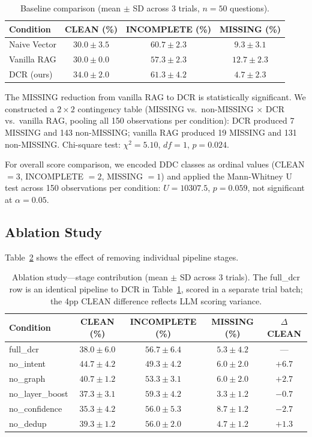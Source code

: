 \documentclass[11pt,a4paper]{article}
\begin{document}
\begin{table}[h]
\centering
\caption{Baseline comparison (mean $\pm$ SD across 3 trials, $n = 50$ questions).}
\label{tab:baselines}
\begin{tabular}{@{}lccc@{}}
\toprule
Condition & CLEAN (\%) & INCOMPLETE (\%) & MISSING (\%) \\
\midrule
Naive Vector & $30.0 \pm 3.5$ & $60.7 \pm 2.3$ & $9.3 \pm 3.1$ \\
Vanilla RAG & $30.0 \pm 0.0$ & $57.3 \pm 2.3$ & $12.7 \pm 2.3$ \\
DCR (ours) & $34.0 \pm 2.0$ & $61.3 \pm 4.2$ & $\mathbf{4.7 \pm 2.3}$ \\
\bottomrule
\end{tabular}
\end{table}

The MISSING reduction from vanilla RAG to DCR is statistically significant. We constructed a $2 \times 2$ contingency table (MISSING vs.\ non-MISSING $\times$ DCR vs.\ vanilla RAG, pooling all 150 observations per condition): DCR produced 7 MISSING and 143 non-MISSING; vanilla RAG produced 19 MISSING and 131 non-MISSING. Chi-square test: $\chi^2 = 5.10$, $df = 1$, $p = 0.024$.

For overall score comparison, we encoded DDC classes as ordinal values (CLEAN $= 3$, INCOMPLETE $= 2$, MISSING $= 1$) and applied the Mann-Whitney U test across 150 observations per condition: $U = 10307.5$, $p = 0.059$, not significant at $\alpha = 0.05$.

\subsection{Ablation Study}

Table~\ref{tab:ablation} shows the effect of removing individual pipeline stages.

\begin{table}[h]
\centering
\caption{Ablation study---stage contribution (mean $\pm$ SD across 3 trials). The full\_dcr row is an identical pipeline to DCR in Table~\ref{tab:baselines}, scored in a separate trial batch; the 4pp CLEAN difference reflects LLM scoring variance.}
\label{tab:ablation}
\begin{tabular}{@{}lcccc@{}}
\toprule
Condition & CLEAN (\%) & INCOMPLETE (\%) & MISSING (\%) & $\Delta$ CLEAN \\
\midrule
full\_dcr & $38.0 \pm 6.0$ & $56.7 \pm 6.4$ & $5.3 \pm 4.2$ & --- \\
no\_intent & $44.7 \pm 4.2$ & $49.3 \pm 4.2$ & $6.0 \pm 2.0$ & $+6.7$ \\
no\_graph & $40.7 \pm 1.2$ & $53.3 \pm 3.1$ & $6.0 \pm 2.0$ & $+2.7$ \\
no\_layer\_boost & $37.3 \pm 3.1$ & $59.3 \pm 4.2$ & $3.3 \pm 1.2$ & $-0.7$ \\
no\_confidence & $35.3 \pm 4.2$ & $56.0 \pm 5.3$ & $8.7 \pm 1.2$ & $-2.7$ \\
no\_dedup & $39.3 \pm 1.2$ & $56.0 \pm 2.0$ & $4.7 \pm 1.2$ & $+1.3$ \\
\bottomrule
\end{tabular}
\end{table}
\end{document}
